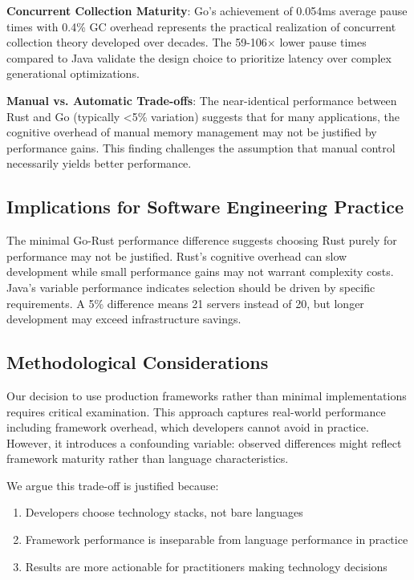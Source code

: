 \documentclass{article}
\begin{document}
\textbf{Concurrent Collection Maturity}: Go's achievement of 0.054ms average pause times with 0.4\% GC overhead represents the practical realization of concurrent collection theory developed over decades. The 59-106$\times$ lower pause times compared to Java validate the design choice to prioritize latency over complex generational optimizations.

\textbf{Manual vs. Automatic Trade-offs}: The near-identical performance between Rust and Go (typically <5\% variation) suggests that for many applications, the cognitive overhead of manual memory management may not be justified by performance gains. This finding challenges the assumption that manual control necessarily yields better performance.

\subsection{Implications for Software Engineering Practice}

The minimal Go-Rust performance difference suggests choosing Rust purely for performance may not be justified. Rust's cognitive overhead can slow development while small performance gains may not warrant complexity costs. Java's variable performance indicates selection should be driven by specific requirements. A 5\% difference means 21 servers instead of 20, but longer development may exceed infrastructure savings.

\subsection{Methodological Considerations}

Our decision to use production frameworks rather than minimal implementations requires critical examination. This approach captures real-world performance including framework overhead, which developers cannot avoid in practice. However, it introduces a confounding variable: observed differences might reflect framework maturity rather than language characteristics.

We argue this trade-off is justified because:
\begin{enumerate}
    \item Developers choose technology stacks, not bare languages
    \item Framework performance is inseparable from language performance in practice
    \item Results are more actionable for practitioners making technology decisions
\end{enumerate}
\end{document}
